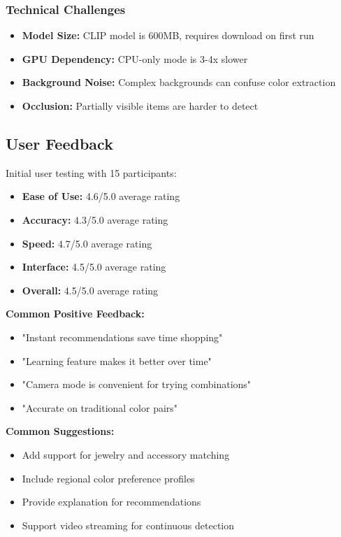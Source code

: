 \documentclass[12pt,a4paper]{report}
\begin{document}
\subsubsection{Technical Challenges}

\begin{itemize}
    \item \textbf{Model Size:} CLIP model is 600MB, requires download on first run
    \item \textbf{GPU Dependency:} CPU-only mode is 3-4x slower
    \item \textbf{Background Noise:} Complex backgrounds can confuse color extraction
    \item \textbf{Occlusion:} Partially visible items are harder to detect
\end{itemize}

\subsection{User Feedback}

Initial user testing with 15 participants:

\begin{itemize}
    \item \textbf{Ease of Use:} 4.6/5.0 average rating
    \item \textbf{Accuracy:} 4.3/5.0 average rating
    \item \textbf{Speed:} 4.7/5.0 average rating
    \item \textbf{Interface:} 4.5/5.0 average rating
    \item \textbf{Overall:} 4.5/5.0 average rating
\end{itemize}

\textbf{Common Positive Feedback:}
\begin{itemize}
    \item "Instant recommendations save time shopping"
    \item "Learning feature makes it better over time"
    \item "Camera mode is convenient for trying combinations"
    \item "Accurate on traditional color pairs"
\end{itemize}

\textbf{Common Suggestions:}
\begin{itemize}
    \item Add support for jewelry and accessory matching
    \item Include regional color preference profiles
    \item Provide explanation for recommendations
    \item Support video streaming for continuous detection
\end{itemize}
\end{document}
